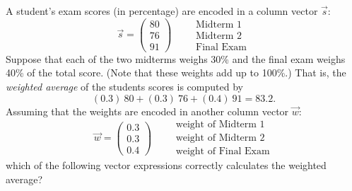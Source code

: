 \documentclass{ximera}
\author{Tae Eun Kim}
\begin{document}
\begin{exercise}
  A student's exam scores (in percentage) are encoded in a column vector $\vec{s}$:
  \[
    \vec{s} =
    \begin{pmatrix}
      80\\ 76\\ 91
    \end{pmatrix}
    \qquad
    \begin{array}{l}
      \text{Midterm 1}\\
      \text{Midterm 2}\\
      \text{Final Exam}
    \end{array}
  \]
  Suppose that each of the two midterms weighs 30\% and the final exam
  weighs 40\% of the total score. (Note that these weights add up to
  100\%.) That is, the \textit{weighted average} of the students
  scores is computed by
  \[
    (0.3)\ 80 + (0.3)\ 76 + (0.4)\ 91 = 83.2.
  \]
  Assuming that the weights are encoded in another column vector $\vec{w}$:
  \[
    \vec{w} =
    \begin{pmatrix}
      0.3\\ 0.3\\ 0.4
    \end{pmatrix}
    \qquad
    \begin{array}{l}
      \text{weight of Midterm 1}\\
      \text{weight of Midterm 2}\\
      \text{weight of Final Exam}
    \end{array}
  \]
  which of the following vector expressions correctly calculates the
  weighted average?
  \begin{selectAll}
    \pdfOnly{\end{multicols}}
  \end{selectAll}
\end{exercise}
\end{document}
